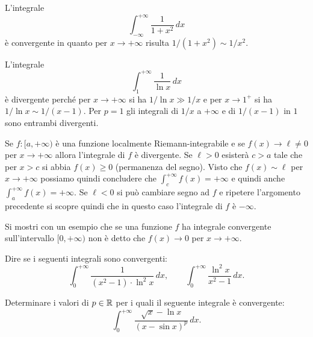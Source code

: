 \begin{example}
L'integrale
\[
  \int_{-\infty}^{+\infty}\frac{1}{1+x^2}\, dx
\]
è convergente in quanto per $x\to +\infty$ risulta $1/(1+x^2) \sim 1/x^2$.

L'integrale
\[
  \int_1^{+\infty} \frac{1}{\ln x}\, dx
\]
è divergente perché per $x\to +\infty$
si ha $1/\ln x \gg 1/x$ e per $x\to 1^+$ si ha
$1/\ln x \sim 1/(x-1)$. Per $p=1$ gli integrali
di $1/x$ a $+\infty$ e di $1/(x-1)$ in $1$
sono entrambi divergenti.

Se $f\colon [a,+\infty)$ è una funzione localmente Riemann-integrabile
e se $f(x)\to \ell \neq 0$ per $x\to +\infty$ allora l'integrale
di $f$ è divergente. Se $\ell>0$ esisterà $c>a$ tale che per $x>c$
si abbia $f(x)\ge 0$ (permanenza del segno). Visto che
$f(x)\sim \ell$ per $x\to +\infty$ possiamo quindi concludere
che $\int_c^{+\infty} f(x) = +\infty$ e
quindi anche
$\int_a^{+\infty} f(x) = +\infty$.
Se $\ell<0$ si può cambiare segno ad $f$ e ripetere l'argomento precedente
si scopre quindi che in questo caso l'integrale di $f$ è $-\infty$.
\end{example}

\begin{exercise}
Si mostri con un esempio che se una funzione $f$ ha integrale
convergente sull'intervallo $[0,+\infty)$ non
è detto che $f(x)\to 0$ per $x\to +\infty$.
\end{exercise}


\begin{exercise}
Dire se i seguenti integrali sono convergenti:
\[
  \int_0^{+\infty} \frac{1}{(x^2-1)\cdot \ln^2 x}\, dx, \qquad
  \int_0^{+\infty} \frac{\ln^2 x}{x^2-1}\, dx.  
\]
\end{exercise}

\begin{exercise}
Determinare i valori di $p\in {\mathbb R}$ per i quali 
il seguente integrale è convergente:
  \[
  \int_0^{+\infty} \frac{\sqrt x-\ln x}{(x-\sin x)^p}\, dx.  
  \]
\end{exercise}


